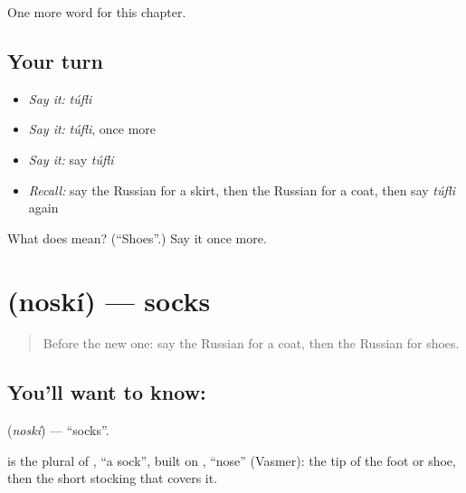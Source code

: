 \begin{grammarlens}[title={What you've built}]
One more word for this chapter.
\end{grammarlens}

\subsection*{Your turn}
\begin{itemize}
\raggedright
  \item \emph{Say it:} \emph{túfli}
  \item \emph{Say it:} \emph{túfli}, once more
  \item \emph{Say it:} say \emph{túfli}
  \item \emph{Recall:} say the Russian for a skirt, then the Russian for a coat, then say \emph{túfli} again
\end{itemize}

\begin{tcolorbox}[breakable,colback=teal!4,colframe=teal!35!black,title={Before you move on}]
What does  mean? (\textquotedblleft{}Shoes\textquotedblright{}.) Say it once more.
\end{tcolorbox}
\section[\texorpdfstring{\ru{носки} (noskí)}{носки (noskí)}]{ (noskí) — socks}

\label{lesson:RU-C102-socks}



\begin{quote}
Before the new one: say the Russian for a coat, then the Russian for shoes.
\end{quote}

\subsection*{You'll want to know: }
\textbf{} (\emph{noskí}) — \textquotedblleft{}socks\textquotedblright{}.

\begin{cousinweb}
\textbf{} is the plural of \emph{}, \textquotedblleft{}a sock\textquotedblright{}, built on \emph{}, \textquotedblleft{}nose\textquotedblright{} (Vasmer): the tip of the foot or shoe, then the short stocking that covers it.
\end{cousinweb}

